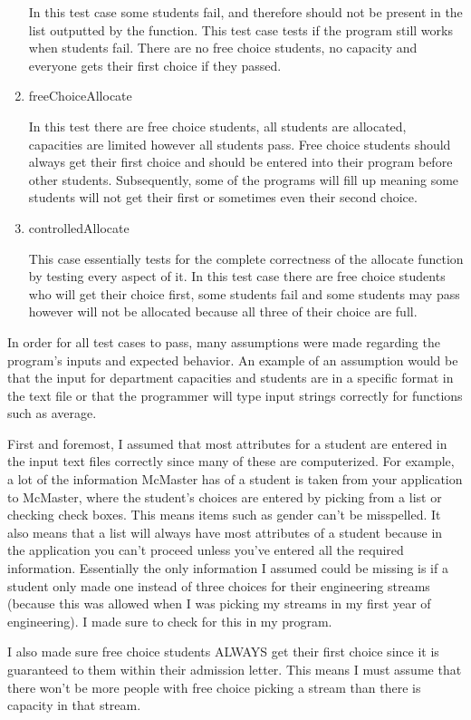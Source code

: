 \documentclass[12pt]{article}
\begin{document}
\begin{enumerate}
In this test case some students fail, and therefore should not be present in the list outputted by the function. This test case tests if the program still works when students fail. There are no free choice students, no capacity and everyone gets their first choice if they passed.
   \item freeChoiceAllocate

In this test there are free choice students, all students are allocated, capacities are limited however all students pass. Free choice students should always get their first choice and should be entered into their program before other students. Subsequently, some of the programs will fill up meaning some students will not get their first or sometimes even their second choice.
   \item controlledAllocate

This case essentially tests for the complete correctness of the allocate function by testing every aspect of it. In this test case there are free choice students who will get their choice first, some students fail and some students may pass however will not be allocated because all three of their choice are full. 
\end{enumerate}

In order for all test cases to pass, many assumptions were made regarding the program's inputs and expected behavior. An example of an assumption would be that the input for department capacities and students are in a specific format in the text file or that the programmer will type input strings correctly for functions such as average.

\bigskip
First and foremost, I assumed that most attributes for a student are entered in the input text files correctly since many of these are computerized. For example, a lot of the information McMaster has of a student is taken from your application to McMaster, where the student's choices are entered by picking from a list or checking check boxes. This means items such as gender can't be misspelled. It also means that a list will always have most attributes of a student because in the application you can't proceed unless you've entered all the required information. Essentially the only information I assumed could be missing is if a student only made one instead of three choices for their engineering streams (because this was allowed when I was picking my streams in my first year of engineering). I made sure to check for this in my program.

\bigskip
I also made sure free choice students ALWAYS get their first choice since it is guaranteed to them within their admission letter. This means I must assume that there won't be more people with free choice picking a stream than there is capacity in that stream. 
\end{document}
